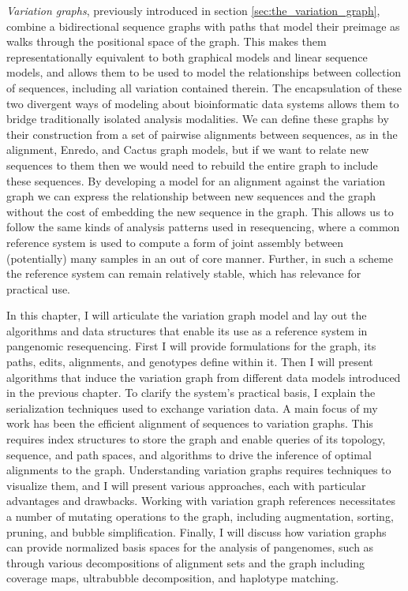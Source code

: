 \emph{Variation graphs}, previously introduced in section \ref{sec:the_variation_graph}, combine a bidirectional sequence graphs with paths that model their preimage as walks through the positional space of the graph.
This makes them representationally equivalent to both graphical models and linear sequence models, and allows them to be used to model the relationships between collection of sequences, including all variation contained therein.
The encapsulation of these two divergent ways of modeling about bioinformatic data systems allows them to bridge traditionally isolated analysis modalities.
We can define these graphs by their construction from a set of pairwise alignments between sequences, as in the alignment, Enredo, and Cactus graph models, but if we want to relate new sequences to them then we would need to rebuild the entire graph to include these sequences.
By developing a model for an alignment against the variation graph we can express the relationship between new sequences and the graph without the cost of embedding the new sequence in the graph.
This allows us to follow the same kinds of analysis patterns used in resequencing, where a common reference system is used to compute a form of joint assembly between (potentially) many samples in an out of core manner.
Further, in such a scheme the reference system can remain relatively stable, which has relevance for practical use.

In this chapter, I will articulate the variation graph model and lay out the algorithms and data structures that enable its use as a reference system in pangenomic resequencing.
First I will provide formulations for the graph, its paths, edits, alignments, and genotypes define within it.
Then I will present algorithms that induce the variation graph from different data models introduced in the previous chapter.
To clarify the system's practical basis, I explain the serialization techniques used to exchange variation data.
A main focus of my work has been the efficient alignment of sequences to variation graphs.
This requires index structures to store the graph and enable queries of its topology, sequence, and path spaces, and algorithms to drive the inference of optimal alignments to the graph.
Understanding variation graphs requires techniques to visualize them, and I will present various approaches, each with particular advantages and drawbacks.
Working with variation graph references necessitates a number of mutating operations to the graph, including augmentation, sorting, pruning, and bubble simplification.
Finally, I will discuss how variation graphs can provide normalized basis spaces for the analysis of pangenomes, such as through various decompositions of alignment sets and the graph including coverage maps, ultrabubble decomposition, and haplotype matching.

